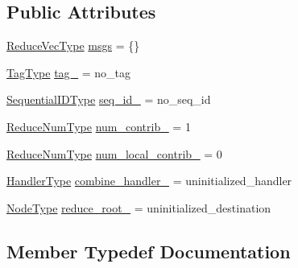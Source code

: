 \subsection*{Public Attributes}
\begin{DoxyCompactItemize}
\item 
\hyperlink{structvt_1_1collective_1_1reduce_1_1_reduce_state_a2336f24c27986fdf5131a3a19bf75107}{Reduce\+Vec\+Type} \hyperlink{structvt_1_1collective_1_1reduce_1_1_reduce_state_aa2939e96ffecd6fbe4a942414cb10624}{msgs} = \{\}
\item 
\hyperlink{namespacevt_a84ab281dae04a52a4b243d6bf62d0e52}{Tag\+Type} \hyperlink{structvt_1_1collective_1_1reduce_1_1_reduce_state_a100d0413795c97cfa7a6ef27e1644be7}{tag\+\_\+} = no\+\_\+tag
\item 
\hyperlink{namespacevt_a3063d4db3b879d6dd2c7b8d50995c7f6}{Sequential\+I\+D\+Type} \hyperlink{structvt_1_1collective_1_1reduce_1_1_reduce_state_a05893a4850acf7457ce1de6f7559b137}{seq\+\_\+id\+\_\+} = no\+\_\+seq\+\_\+id
\item 
\hyperlink{structvt_1_1collective_1_1reduce_1_1_reduce_state_adda7ff0ae58325a43a0a8bad447a8bfb}{Reduce\+Num\+Type} \hyperlink{structvt_1_1collective_1_1reduce_1_1_reduce_state_a5a87b61090a531d1620bd30db0d51f31}{num\+\_\+contrib\+\_\+} = 1
\item 
\hyperlink{structvt_1_1collective_1_1reduce_1_1_reduce_state_adda7ff0ae58325a43a0a8bad447a8bfb}{Reduce\+Num\+Type} \hyperlink{structvt_1_1collective_1_1reduce_1_1_reduce_state_a39c9d306edf9f1a528c097643f33bd99}{num\+\_\+local\+\_\+contrib\+\_\+} = 0
\item 
\hyperlink{namespacevt_af64846b57dfcaf104da3ef6967917573}{Handler\+Type} \hyperlink{structvt_1_1collective_1_1reduce_1_1_reduce_state_a4b2d07f4e71a43db313f0ca84420e1df}{combine\+\_\+handler\+\_\+} = uninitialized\+\_\+handler
\item 
\hyperlink{namespacevt_a866da9d0efc19c0a1ce79e9e492f47e2}{Node\+Type} \hyperlink{structvt_1_1collective_1_1reduce_1_1_reduce_state_a02a1d24c695eeac20c840fdf2d629dc6}{reduce\+\_\+root\+\_\+} = uninitialized\+\_\+destination
\end{DoxyCompactItemize}


\subsection{Member Typedef Documentation}
\mbox{\label{structvt_1_1collective_1_1reduce_1_1_reduce_state_adda7ff0ae58325a43a0a8bad447a8bfb}} 
